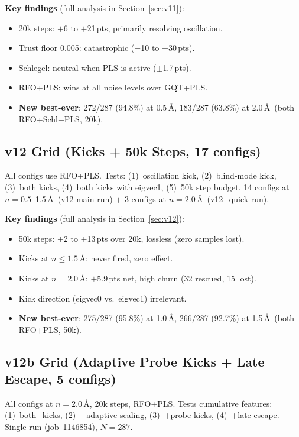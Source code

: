 \documentclass[11pt,a4paper]{article}
\theoremstyle{definition}
\begin{document}
\textbf{Key findings} (full analysis in Section~\ref{sec:v11}):
\begin{itemize}[nosep]
  \item 20k steps: $+$6 to $+$21\,pts, primarily resolving oscillation.
  \item Trust floor 0.005: catastrophic ($-$10 to $-$30\,pts).
  \item Schlegel: neutral when PLS is active ($\pm$1.7\,pts).
  \item RFO+PLS: wins at all noise levels over GQT+PLS.
  \item \textbf{New best-ever}: 272/287 (94.8\%) at 0.5\,\AA, 183/287
    (63.8\%) at 2.0\,\AA\ (both RFO+Schl+PLS, 20k).
\end{itemize}

\subsection{v12 Grid (Kicks + 50k Steps, 17 configs)}

All configs use RFO+PLS.  Tests: (1)~oscillation kick, (2)~blind-mode
kick, (3)~both kicks, (4)~both kicks with eigvec1, (5)~50k step budget.
14 configs at $n=0.5$--1.5\,\AA\ (v12 main run) $+$ 3 configs at
$n=2.0$\,\AA\ (v12\_quick run).

\textbf{Key findings} (full analysis in Section~\ref{sec:v12}):
\begin{itemize}[nosep]
  \item 50k steps: $+$2 to $+$13\,pts over 20k, lossless (zero samples lost).
  \item Kicks at $n \leq 1.5$\,\AA: never fired, zero effect.
  \item Kicks at $n=2.0$\,\AA: $+$5.9\,pts net, high churn (32 rescued, 15 lost).
  \item Kick direction (eigvec0 vs.\ eigvec1) irrelevant.
  \item \textbf{New best-ever}: 275/287 (95.8\%) at 1.0\,\AA, 266/287
    (92.7\%) at 1.5\,\AA\ (both RFO+PLS, 50k).
\end{itemize}

\subsection{v12b Grid (Adaptive Probe Kicks + Late Escape, 5 configs)}

All configs at $n=2.0$\,\AA, 20k steps, RFO+PLS.  Tests cumulative
features: (1)~both\_kicks, (2)~+adaptive scaling, (3)~+probe kicks,
(4)~+late escape.  Single run (job~1146854), $N=287$.
\end{document}

